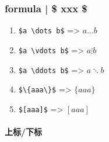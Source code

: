 
\subsubsection{formula | \$ xxx \$}

\begin{enumerate}[topsep=0pt,itemsep=0pt,parsep=0pt,leftmargin=3.6em,label=\arabic*>]
    \item {\color{teal}\verb!$a \dots b$!} => $a \dots b$
    \item {\color{teal}\verb!$a \vdots b$!} => $a \vdots b$
    \item {\color{teal}\verb!$a \ddots b$!} => $a \ddots b$
    \item {\color{teal}\verb!$\{aaa\}$!} => $\{aaa\}$
    \item {\color{teal}\verb!$[aaa]$!} => $[aaa]$
\end{enumerate}

\paragraph{上标/下标}~{}

